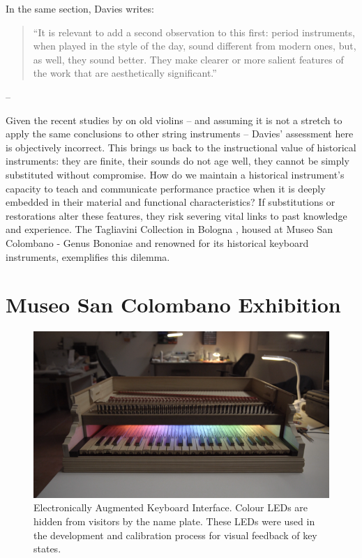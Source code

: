 In the same section, Davies writes:

\begin{quotation}
``It is relevant to add a second observation to this first: period instruments, when played in the style of the day, sound different from modern ones, but, as well, they sound better. They make clearer or more salient features of the work that are aesthetically significant.''
\end{quotation}
\begin{flushright}
-- \cite[p. 218]{davies_authenticity_2001}
\end{flushright}

Given the recent studies by \textcite{fritz_player_2012, fritz_soloist_2014, fritz_listener_2017} on old violins -- and assuming it is not a stretch to apply the same conclusions to other string instruments -- Davies' assessment here is objectively incorrect.
This brings us back to the instructional value of historical instruments: they are finite, their sounds do not age well, they cannot be simply substituted without compromise. How do we maintain a historical instrument's capacity to teach and communicate performance practice when it is deeply embedded in their material and functional characteristics? If substitutions or restorations alter these features, they risk severing vital links to past knowledge and experience. The Tagliavini Collection in Bologna \cite{tagliavini_clavicembali_1987}, housed at Museo San Colombano - Genus Bononiae and renowned for its historical keyboard instruments, exemplifies this dilemma.

\section{Museo San Colombano Exhibition}
\begin{figure}
    \centering
    \includegraphics[width=1\linewidth]{img/mark2.png}
    \caption{Electronically Augmented Keyboard Interface. Colour LEDs are hidden from visitors by the name plate. These LEDs were used in the development and calibration process for visual feedback of key states.}
    \label{fig:mark2}
\vfill\end{figure}

